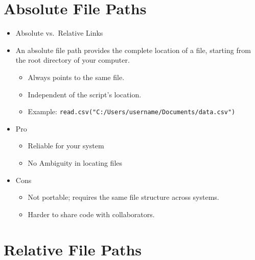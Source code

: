 \documentclass[
  letterpaper,
  DIV=11,
  numbers=noendperiod]{scrreprt}
\providecommand{\tightlist}{%
  \setlength{\itemsep}{0pt}\setlength{\parskip}{0pt}}\usepackage{longtable,booktabs,array}
\begin{document}
\section{Absolute File Paths}\label{absolute-file-paths}

\begin{itemize}
\tightlist
\item
  Absolute vs.~Relative Links
\item
  An absolute file path provides the complete location of a file,
  starting from the root directory of your computer.

  \begin{itemize}
  \tightlist
  \item
    Always points to the same file.
  \item
    Independent of the script's location.
  \item
    Example: \texttt{read.csv("C:/Users/username/Documents/data.csv")}
  \end{itemize}
\item
  Pro

  \begin{itemize}
  \tightlist
  \item
    Reliable for your system
  \item
    No Ambiguity in locating files
  \end{itemize}
\item
  Cons

  \begin{itemize}
  \tightlist
  \item
    Not portable; requires the same file structure across systems.
  \item
    Harder to share code with collaborators.
  \end{itemize}
\end{itemize}

\section{Relative File Paths}\label{relative-file-paths}
\end{document}
